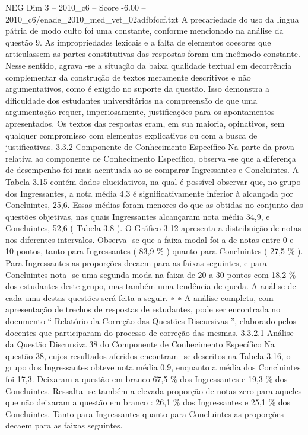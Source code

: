 \begin{textsample}{NEG Dim 3 – 2010\_c6 – Score -6.00 – 2010\_c6/enade\_2010\_med\_vet\_02adfbfccf.txt}
A precariedade do uso da língua pátria de modo culto foi uma constante, conforme mencionado na análise da questão 9.
As impropriedades lexicais e a falta de elementos coesores que articulassem as partes constitutivas das respostas foram um incômodo constante.
Nesse sentido, agrava -se a situação da baixa qualidade textual em decorrência complementar da construção de textos meramente descritivos e não argumentativos, como é exigido no suporte da questão.
Isso demonstra a dificuldade dos estudantes universitários na compreensão de que uma argumentação requer, imperiosamente, justificações para os apontamentos apresentados.
Os textos das respostas eram, em sua maioria, opinativos, sem qualquer compromisso com elementos explicativos ou com a busca de justificativas. 3.3.2 Componente de Conhecimento Específico Na parte da prova relativa ao componente de Conhecimento Específico, observa -se que a diferença de desempenho foi mais acentuada ao se comparar Ingressantes e Concluintes.
A Tabela 3.15 contém dados elucidativos, na qual é possível observar que, no grupo dos Ingressantes, a nota média 4,3 é significativamente inferior à alcançada por Concluintes, 25,6.
Essas médias foram menores do que as obtidas no conjunto das questões objetivas, nas quais Ingressantes alcançaram nota média 34,9, e Concluintes, 52,6 ( Tabela 3.8 ).
O Gráfico 3.12 apresenta a distribuição de notas nos diferentes intervalos.
Observa -se que a faixa modal foi a de notas entre 0 e 10 pontos, tanto para Ingressantes ( 83,9 \% ) quanto para Concluintes ( 27,5 \% ).
Para Ingressantes as proporções decaem para as faixas seguintes, e para Concluintes nota -se uma segunda moda na faixa de 20 a 30 pontos com 18,2 \% dos estudantes deste grupo, mas também uma tendência de queda.
A análise de cada uma destas questões será feita a seguir. ∗ ∗ A análise completa, com apresentação de trechos de respostas de estudantes, pode ser encontrada no documento “ Relatório da Correção das Questões Discursivas ”, elaborado pelos docentes que participaram do processo de correção das mesmas. 3.3.2.1 Análise da Questão Discursiva 38 do Componente de Conhecimento Específico Na questão 38, cujos resultados aferidos encontram -se descritos na Tabela 3.16, o grupo dos Ingressantes obteve nota média 0,9, enquanto a média dos Concluintes foi 17,3.
Deixaram a questão em branco 67,5 \% dos Ingressantes e 19,3 \% dos Concluintes.
Ressalta -se também a elevada proporção de notas zero para aqueles que não deixaram a questão em branco : 26,1 \% dos Ingressantes e 25,1 \% dos Concluintes.
Tanto para Ingressantes quanto para Concluintes as proporções decaem para as faixas seguintes.

\end{textsample}
